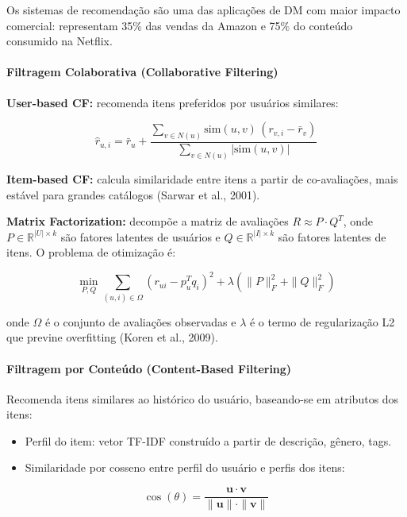 \documentclass[12pt,a4paper]{article}
\begin{document}
Os sistemas de recomendação são uma das aplicações de DM com maior impacto comercial: representam 35\% das vendas da Amazon e 75\% do conteúdo consumido na Netflix.

\paragraph{Filtragem Colaborativa (Collaborative Filtering)}

\textbf{User-based CF:} recomenda itens preferidos por usuários similares:

\begin{equation}
  \hat{r}_{u,i} = \bar{r}_u + \frac{\displaystyle\sum_{v \in N(u)} \text{sim}(u,v)\,(r_{v,i} - \bar{r}_v)}{\displaystyle\sum_{v \in N(u)} |\text{sim}(u,v)|}
\end{equation}

\textbf{Item-based CF:} calcula similaridade entre itens a partir de co-avaliações, mais estável para grandes catálogos (Sarwar et al., 2001).

\textbf{Matrix Factorization:} decompõe a matriz de avaliações $R \approx P \cdot Q^T$, onde $P \in \mathbb{R}^{|U| \times k}$ são fatores latentes de usuários e $Q \in \mathbb{R}^{|I| \times k}$ são fatores latentes de itens. O problema de otimização é:

\begin{equation}
  \min_{P,Q} \sum_{(u,i) \in \Omega} \left(r_{ui} - p_u^T q_i\right)^2 + \lambda\left(\|P\|_F^2 + \|Q\|_F^2\right)
\end{equation}

onde $\Omega$ é o conjunto de avaliações observadas e $\lambda$ é o termo de regularização L2 que previne overfitting (Koren et al., 2009).

\paragraph{Filtragem por Conteúdo (Content-Based Filtering)}

Recomenda itens similares ao histórico do usuário, baseando-se em atributos dos itens:
\begin{itemize}
  \item Perfil do item: vetor TF-IDF construído a partir de descrição, gênero, tags.
  \item Similaridade por cosseno entre perfil do usuário e perfis dos itens:
\end{itemize}

\begin{equation}
  \cos(\theta) = \frac{\mathbf{u} \cdot \mathbf{v}}{\|\mathbf{u}\| \cdot \|\mathbf{v}\|}
\end{equation}
\end{document}
